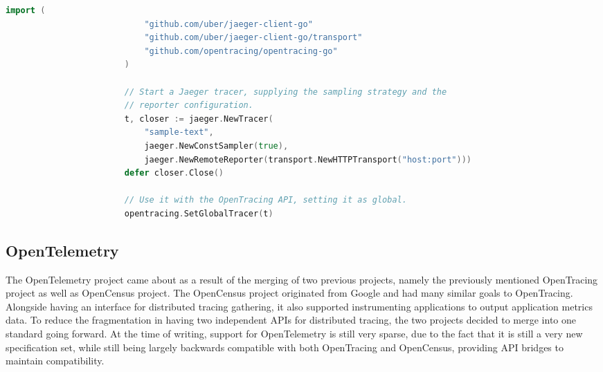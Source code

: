 \documentclass[12pt,pdftex,titlepage]{report}
\begin{document}
                \bigskip
                \begin{spacing}{1.0}
                    \begin{lstlisting}[caption=Example Go language snippet of instatiating a Jaeger OpenTracing compatible tracer., language=Go, gobble=24, label={lst:jaegertrace}]
                        import (
                            "github.com/uber/jaeger-client-go"
                            "github.com/uber/jaeger-client-go/transport"
                            "github.com/opentracing/opentracing-go"
                        )

                        // Start a Jaeger tracer, supplying the sampling strategy and the
                        // reporter configuration.
                        t, closer := jaeger.NewTracer(
                            "sample-text",
                            jaeger.NewConstSampler(true),
                            jaeger.NewRemoteReporter(transport.NewHTTPTransport("host:port")))
                        defer closer.Close()

                        // Use it with the OpenTracing API, setting it as global.
                        opentracing.SetGlobalTracer(t)
                    \end{lstlisting}
                \end{spacing}

            \subsection{OpenTelemetry}
            \label{sec:opentele}
                The OpenTelemetry\cite{opentelemetry} project came about as a result of the merging of two previous projects, namely the previously mentioned OpenTracing
                project as well as OpenCensus project. The OpenCensus project originated from Google and had many similar goals to OpenTracing. Alongside having an interface
                for distributed tracing gathering, it also supported instrumenting applications to output application metrics data. To reduce the fragmentation in having
                two independent APIs for distributed tracing, the two projects decided to merge into one standard going forward. At the time of writing, support for OpenTelemetry
                is still very sparse, due to the fact that it is still a very new specification set, while still being largely backwards compatible with both OpenTracing and 
                OpenCensus, providing API bridges to maintain compatibility. 
\end{document}
